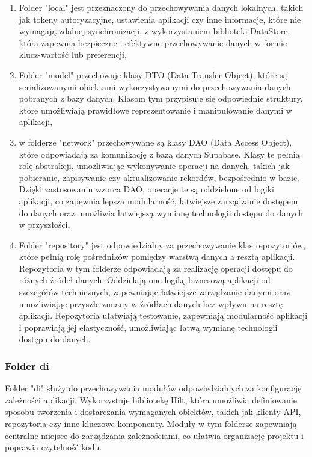 \documentclass[12pt,twoside]{article}
\begin{document}
\begin{enumerate}[label=\alph*), leftmargin=1.25cm]
	\item Folder "local" jest przeznaczony do przechowywania danych lokalnych, takich jak tokeny autoryzacyjne, 
	ustawienia aplikacji czy inne informacje, które nie wymagają zdalnej synchronizacji, z wykorzystaniem biblioteki 
	DataStore, która zapewnia bezpieczne i efektywne przechowywanie danych w formie klucz-wartość lub preferencji,
	\item Folder "model" przechowuje klasy DTO (Data Transfer Object), które są serializowanymi obiektami 
	wykorzystywanymi do przechowywania danych pobranych z bazy danych. Klasom tym przypisuje się odpowiednie 
	struktury, które umożliwiają prawidłowe reprezentowanie i manipulowanie danymi w aplikacji,
	\item w folderze "network" przechowywane są klasy DAO (Data Access Object), które odpowiadają za komunikację z 
	bazą danych Supabase. Klasy te pełnią rolę abstrakcji, umożliwiając wykonywanie operacji na danych, takich jak 
	pobieranie, zapisywanie czy aktualizowanie rekordów, bezpośrednio w bazie. Dzięki zastosowaniu wzorca DAO, 
	operacje te są oddzielone od logiki aplikacji, co zapewnia lepszą modularność, łatwiejsze zarządzanie dostępem do 
	danych oraz umożliwia łatwiejszą wymianę technologii dostępu do danych w przyszłości,
	\item Folder "repository" jest odpowiedzialny za przechowywanie klas repozytoriów, które pełnią rolę pośredników 
	pomiędzy warstwą danych a resztą aplikacji. Repozytoria w tym folderze odpowiadają za realizację operacji dostępu 
	do różnych źródeł danych. Oddzielają one logikę biznesową aplikacji od szczegółów technicznych, zapewniając 
	łatwiejsze zarządzanie danymi oraz umożliwiając przyszłe zmiany w źródłach danych bez wpływu na resztę aplikacji. 
	Repozytoria ułatwiają testowanie, zapewniają modularność aplikacji i poprawiają jej elastyczność, umożliwiając 
	łatwą wymianę technologii dostępu do danych.
\end{enumerate}

\subsubsection{Folder di}

Folder "di" służy do przechowywania modułów odpowiedzialnych za konfigurację zależności aplikacji. Wykorzystuje 
bibliotekę Hilt, która umożliwia definiowanie sposobu tworzenia i dostarczania wymaganych obiektów, takich jak 
klienty API, repozytoria czy inne kluczowe komponenty. Moduły w tym folderze zapewniają centralne miejsce do 
zarządzania zależnościami, co ułatwia organizację projektu i poprawia czytelność kodu.
\end{document}
